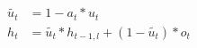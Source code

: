 \documentclass{article}
\begin{document}
\begin{align*}
	\tilde{u_{t}} &= 1 - a_{t} * u_{t} \\
	h_{t} &= \tilde{u_{t}} * h_{t-1,l} + (1-\tilde{u_{t}})*o_{t}
\end{align*}
\end{document}
